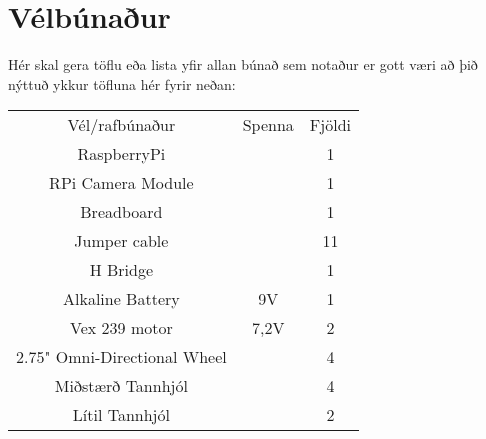 \section{Vélbúnaður}
Hér skal gera töflu eða lista yfir allan búnað sem notaður er gott væri að þið nýttuð ykkur töfluna hér fyrir neðan:

\begin{center}
\begin{tabular}{ |c|c|c| } 
 \hline
 Vél/rafbúnaður &Spenna &Fjöldi\\ 
 RaspberryPi & & 1 \\ 
 RPi Camera Module & & 1 \\
 Breadboard & & 1 \\
 Jumper cable & & 11 \\
 H Bridge & & 1 \\
 Alkaline Battery & 9V & 1 \\
 Vex 239 motor & 7,2V & 2 \\
 2.75" Omni-Directional Wheel & & 4 \\
 Miðstærð Tannhjól & & 4 \\
 Lítil Tannhjól & & 2 \\
 \hline
\end{tabular}
\end{center}